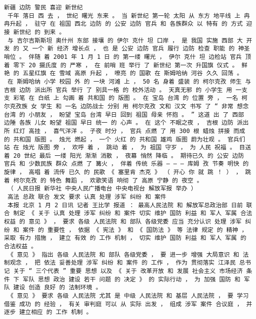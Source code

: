 \documentclass{article}
\begin{document}
\begin{Verbatim}[commandchars=\\\{\}]
 新疆 边防 警民 喜迎 新世纪 
 千年 落日 西 去 ， 世纪 曙光 东来 。 当 新世纪 第一轮 太阳 从 东方 地平线 上 冉冉升起 ， 驻守 在 祖国 西北 边防 的 公安 边防 官兵 和 各族群众 以 特有 的 方式 迎接 新世纪 的 到来 。 
 与 吉尔吉斯斯坦 奥什州 东部 接壤 的 伊尔 克什 坦 口岸 ， 是 我国 实施 西部 大 开发 的 又 一个 新 经济 增长点 ， 也 是 公安 边防 官兵 履行 边防 检查 职能 的 神圣 哨位 。 伴随 着 2001 年 1 月 1 日 的 第一缕 曙光 ， 伊尔 克什 坦 边检站 官兵 顶 着 零下 20 摄氏度 的 严寒 ， 在 前哨 班 举行 了 新世纪 第一次 升国旗 仪式 。 鲜艳 的 五星红旗 在 雪域 高原 升起 ， 嘹亮 的 国歌 在 斯姆哈纳 河谷 久久 回荡 。 
 在 斯姆哈纳 小学 校园 外 的 一块 河滩 上 ， 50 名 身着 盛装 的 柯尔克孜 师生 与 吉根 边防 派出所 官兵 举行 了 别具一格 的 校外活动 。 天真无邪 的 小学生 用 一支 支 彩笔 在 白纸 上 勾画 着 共和国 的 版图 。 在 宝岛 台湾 的 位置 旁 ， 一名 柯尔克孜族 女 学生 和 一名 边防战士 分别 用 柯尔克孜 文和 汉文 书写 了 “ 非常 想念 台湾 的 小朋友 ， 盼望 宝岛 台湾 早日 回到 祖国 母亲 怀抱 。 ” 这道 出 了 西部 边陲 各族 儿女 盼望 祖国 早日 统一 的 心声 。 在 这个 不眠之夜 ， 吉根 边防 派出所 红灯 高挂 ， 喜气洋洋 。 子夜 时分 ， 官兵 点燃 了 用 300 根 蜡烛 拼接 而成 的 共和国 版图 。 烛光 燃起 ， 一个 火红 的 共和国 雄鸡 版图 蔚为壮观 。 官兵们 站 在 烛光 版图 旁 ， 欢呼 着 ， 跳动 着 ， 为 祖国 守岁 ， 为 人民 祝福 。 目送 着 20 世纪 最后 一缕 阳光 渐渐 消散 ， 夜幕 悄然 降临 。 期待已久 的 公安 边防 官兵 和 少数民族 群众 点燃 了 篝火 ， 伴着 传统 乐器 — — — 库姆 孜 节奏 明快 的 旋律 ， 高唱 着 流传 已久 的 民歌 《 塞里肯 杰克 》 （ 开心 你 就 跳 ！ ） ， 跳 着 柯尔克孜 的 特色 舞蹈 ， 欢歌笑语 响彻 了 高原 宁静 的 夜空 。 
 （ 人民日报 新华社 中央人民广播电台 中央电视台 解放军报 举办 ） 
 高法 总政 联合 发文 要求 认真 处理 涉军 纠纷 和 案件 
 本报 北京 1 月 2 日讯 记者 王比学 报道 ： 最高人民法院 和 解放军总政治部 日前 联合 制定 《 关于 认真 处理 涉军 纠纷 和 案件 切实 维护 国防 利益 和 军人 军属 合法权益 的 意见 》 ， 要求 各级 人民法院 和 部队 各级党委 应当 充分认识 处理 涉军 纠纷 和 案件 的 重要性 ， 依据 《 宪法 》 和 《 国防法 》 等 法律 规定 的 精神 ， 采取 有力 措施 ， 建立 有效 的 工作 机制 ， 切实 维护 国防 利益 和 军人 军属 的 合法权益 。 
 《 意见 》 指出 各级 人民法院 和 部队 各级党委 ， 要 进一步 增强 大局意识 和 法制观念 ， 把 依法 妥善处理 涉军 纠纷 和 案件 的 工作 ， 作为 贯彻落实 江泽民 总书记 关于 “ 三个代表 ” 重要 思想 以及 《 关于 改革开放 和 发展 社会主义 市场经济 条件 下 军队 思想 政治 建设 若干 问题 的 决定 》 的 实际行动 ， 为 加强 国防 和 军队 建设 创造 良好 的 法制环境 。 
 《 意见 》 要求 各级 人民法院 尤其 是 中级 人民法院 和 基层 人民法院 ， 要 学习 借鉴 成功 的 经验 ， 有关 审判庭 可以 从 实际 出发 ， 组成 涉军 案件 合议庭 ， 并 逐步 建立相应 的 工作 机制 。 

\end{Verbatim}
\end{document}
